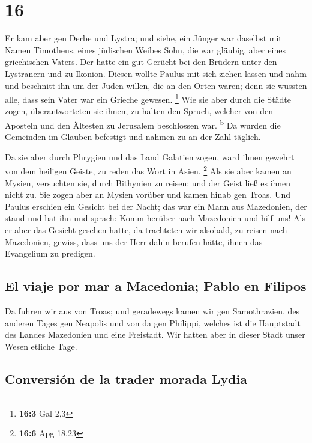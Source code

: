 \hypertarget{section-15}{%
\section{16}\label{section-15}}

 Er kam aber gen Derbe und Lystra; und siehe, ein Jünger
war daselbst mit Namen Timotheus, eines jüdischen Weibes Sohn, die war
gläubig, aber eines griechischen Vaters.  Der hatte ein
gut Gerücht bei den Brüdern unter den Lystranern und zu Ikonion.
 Diesen wollte Paulus mit sich ziehen lassen und nahm und
beschnitt ihn um der Juden willen, die an den Orten waren; denn sie
wussten alle, dass sein Vater war ein Grieche gewesen. \footnote{\textbf{16:3}
  Gal 2,3}  Wie sie aber durch die Städte zogen,
überantworteten sie ihnen, zu halten den Spruch, welcher von den
Aposteln und den Ältesten zu Jerusalem beschlossen war.
\textsuperscript{b}  Da wurden die Gemeinden im Glauben
befestigt und nahmen zu an der Zahl täglich.

 Da sie aber durch Phrygien und das Land Galatien zogen,
ward ihnen gewehrt von dem heiligen Geiste, zu reden das Wort in Asien.
\footnote{\textbf{16:6} Apg 18,23}  Als sie aber kamen an
Mysien, versuchten sie, durch Bithynien zu reisen; und der Geist ließ es
ihnen nicht zu.  Sie zogen aber an Mysien vorüber und
kamen hinab gen Troas.  Und Paulus erschien ein Gesicht
bei der Nacht; das war ein Mann aus Mazedonien, der stand und bat ihn
und sprach: Komm herüber nach Mazedonien und hilf uns! 
Als er aber das Gesicht gesehen hatte, da trachteten wir alsobald, zu
reisen nach Mazedonien, gewiss, dass uns der Herr dahin berufen hätte,
ihnen das Evangelium zu predigen.

\hypertarget{el-viaje-por-mar-a-macedonia-pablo-en-filipos}{%
\subsection{El viaje por mar a Macedonia; Pablo en
Filipos}\label{el-viaje-por-mar-a-macedonia-pablo-en-filipos}}

 Da fuhren wir aus von Troas; und geradewegs kamen wir
gen Samothrazien, des anderen Tages gen Neapolis  und von
da gen Philippi, welches ist die Hauptstadt des Landes Mazedonien und
eine Freistadt. Wir hatten aber in dieser Stadt unser Wesen etliche
Tage.

\hypertarget{conversiuxf3n-de-la-trader-morada-lydia}{%
\subsection{Conversión de la trader morada
Lydia}\label{conversiuxf3n-de-la-trader-morada-lydia}}


